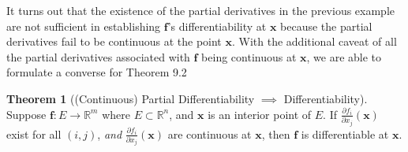 \documentclass{article}
\newcommand{\R}{\mathbb{R}}
\newcommand{\x}{\mathbf{x}}
\newcommand{\f}{\mathbf{f}}
\theoremstyle{definition}
\newtheorem{theorem}{Theorem}[section]
\begin{document}
It turns out that the existence of the partial derivatives in the previous example are not sufficient in establishing $ \f $'s differentiability at $ \x $ because the partial derivatives fail to be continuous at the point $ \x $. With the additional caveat of all the partial derivatives associated with $ \f $ being continuous at $ \x $, we are able to formulate a converse for Theorem 9.2
\begin{theorem}[(Continuous) Partial Differentiability $\implies$ Differentiability]
		Suppose $ \f:E\to\R^m $ where $ E\subset \R^n $, and $ \mathbf x $ is an interior point of $ E $. If $ \frac{\partial f_i}{\partial x_j}(\x) $ exist for all $ (i,j) $, \textit{and} $ \frac{\partial f_i}{\partial x_j}(\x) $ are continuous at $ \x $, then $ \f $ is differentiable at $ \x $.  
		
\end{theorem}
\end{document}
